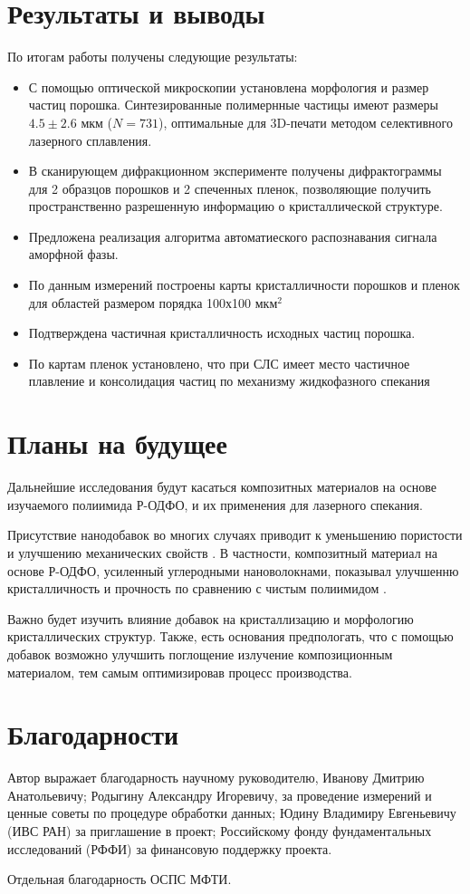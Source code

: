 \section{Результаты и выводы}

По итогам работы получены следующие результаты:

\begin{itemize}
    \item С помощью оптической микроскопии установлена морфология и размер частиц порошка. Синтезированные полимернные частицы имеют размеры $4.5 \pm 2.6$ мкм ($N = 731$), оптимальные для 3D-печати методом селективного лазерного сплавления. 
    \item В сканирующем дифракционном эксперименте получены дифрактограммы для 2 образцов порошков и 2 спеченных пленок, позволяющие получить пространственно разрешенную информацию о кристаллической структуре.
    \item Предложена реализация алгоритма автоматиеского распознавания сигнала аморфной фазы. 
    \item По данным измерений построены карты кристалличности порошков и пленок для областей размером порядка 100х100 мкм$^2$
    \item Подтверждена частичная кристалличность исходных частиц порошка.
    \item По картам пленок установлено, что при СЛС имеет место частичное плавление и консолидация частиц по механизму жидкофазного спекания
\end{itemize}



\section{Планы на будущее}

Дальнейшие исследования будут касаться композитных материалов на основе изучаемого полиимида Р-ОДФО, и их применения для лазерного спекания.

Присутствие нанодобавок во многих случаях приводит к уменьшению пористости и улучшению механических свойств \cite{sls-composite,  comp-review}. В частности, композитный материал на основе Р-ОДФО, усиленный углеродными нановолокнами, показывал улучшенню кристалличность и прочность по сравнению с чистым полиимидом \cite{pi-formula}.

Важно будет изучить влияние добавок на кристаллизацию и морфологию кристаллических структур. Также, есть основания предпологать, что с помощью добавок возможно улучшить поглощение излучение композиционным материалом, тем самым оптимизировав процесс производства.



\section{Благодарности}
Автор выражает благодарность научному руководителю, Иванову Дмитрию Анатольевичу; Родыгину Александру Игоревичу, за проведение измерений и ценные советы по процедуре обработки данных;
Юдину Владимиру Евгеньевичу (ИВС РАН) за приглашение в проект;
Российскому фонду фундаментальных исследований (РФФИ) за финансовую поддержку проекта.

Отдельная благодарность ОСПС МФТИ. 